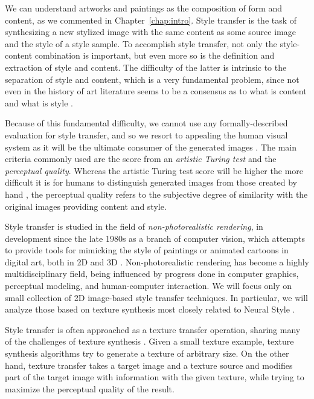 We can understand artworks and paintings as the composition of form and content, as we commented in Chapter~\ref{chap:intro}.
Style transfer is the task of synthesizing a new stylized image with the same content as some source image and the style of a style sample.
To accomplish style transfer, not only the style-content combination is important, but even more so is the definition and extraction of style and content.
The difficulty of the latter is intrinsic to the separation of style and content, which is a very fundamental problem, since not even in the history of art literature seems to be a consensus as to what is content and what is style \cite{Xie2007}.

Because of this fundamental difficulty, we cannot use any formally-described evaluation for style transfer, and so we resort to appealing the human visual system as it will be the ultimate consumer of the generated images \cite{Lin2011}.
The main criteria commonly used are the score from an \emph{artistic Turing test} and the \emph{perceptual quality}.
Whereas the artistic Turing test score will be higher the more difficult it is for humans to distinguish generated images from those created by hand \cite{Kyprianidis2013}, the perceptual quality refers to the subjective degree of similarity with the original images providing content and style.

Style transfer is studied in the field of \emph{non-photorealistic rendering}, in development since the late 1980s as a branch of computer vision, which attempts to provide tools for mimicking the style of paintings or animated cartoons in digital art, both in 2D and 3D \cite{Lee2010, Kyprianidis2013}.
Non-photorealistic rendering has become a highly multidisciplinary field, being influenced by progress done in computer graphics, perceptual modeling, and human-computer interaction.
We will focus only on small collection of 2D image-based style transfer techniques.
In particular, we will analyze those based on texture synthesis most closely related to Neural Style \cite{Gatys2015B}.

Style transfer is often approached as a texture transfer operation, sharing many of the challenges of texture synthesis \cite{Ashikhmin2003}.
Given a small texture example, texture synthesis algorithms try to generate a texture of arbitrary size.
On the other hand, texture transfer takes a target image and a texture source and modifies part of the target image with information with the given texture, while trying to maximize the perceptual quality of the result.

